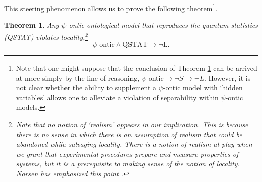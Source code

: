 \documentclass[aps,nofootinbib,12pt]{revtex4}
\newtheorem{theorem}{Theorem}
\begin{document}
This steering phenomenon allows us to prove the following
theorem\footnote{Note that one might suppose that the conclusion of
Theorem \ref{THRM:psi_ont_nonlocal} can be arrived at more simply by
the line of reasoning,
$\psi$-ontic$\rightarrow\lnot{S}\rightarrow\lnot{L}$. However, it is
not clear whether the ability to supplement a $\psi$-ontic model
with `hidden variables' allows one to alleviate a violation of
separability within $\psi$-ontic models.}.
\begin{theorem}
Any $\psi$-ontic ontological model that reproduces the quantum
statistics (QSTAT) violates locality,\footnote{Note that no notion
of `realism' appears in our implication.  This is because there is
no sense in which there is an assumption of realism that could be
abandoned while salvaging locality.  There \emph{is} a notion of
realism at play when we grant that experimental procedures prepare
and measure properties of systems, but it is a \emph{prerequisite}
to making sense of the notion of locality. Norsen has emphasized
this point \cite{norsen_blrealism,norsen_againstrealism}.}
\[
\psi\text{-ontic}\wedge\text{QSTAT}\rightarrow\lnot\text{L.}
\]
\label{THRM:psi_ont_nonlocal}
\end{theorem}
\end{document}
